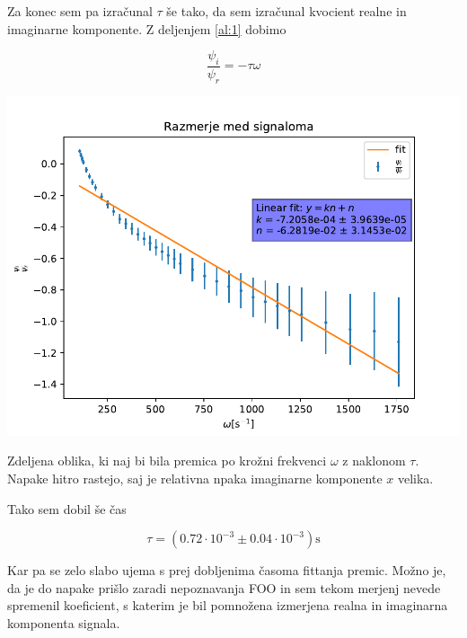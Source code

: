 \documentclass[11pt]{article}
\renewcommand{%
  \refname}{Viri}
\begin{document}
Za konec sem pa izračunal \(\tau\) še tako, da sem izračunal kvocient realne in imaginarne komponente. Z deljenjem \ref{al:1} dobimo

\[ \frac{\psi_i}{\psi_r} = - \tau \omega
\]

\begin{slika}[H]
  \begin{center}
    \includegraphics[width=.9\linewidth]{figures/deljena}
  \end{center}
  \caption{\small Zdeljena oblika, ki naj bi bila premica po krožni frekvenci \( \omega \) z naklonom \( \tau \). Napake hitro rastejo, saj je relativna npaka imaginarne komponente \( x \) velika.}
\end{slika}


Tako sem dobil še čas

\[ \tau = (0.72 \cdot 10^{-3} \pm 0.04 \cdot 10^{-3}) \mathrm{s}
\]

Kar pa se zelo slabo ujema s prej dobljenima časoma fittanja premic. Možno je, da je do napake prišlo zaradi nepoznavanja FOO in sem tekom merjenj nevede spremenil koeficient, s katerim je bil pomnožena izmerjena realna in imaginarna komponenta signala.




\end{document}
